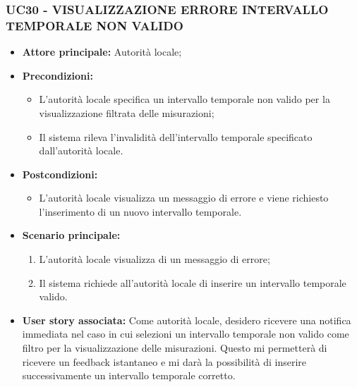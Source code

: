\subsubsection{UC30 - VISUALIZZAZIONE ERRORE INTERVALLO TEMPORALE NON VALIDO}
\begin{itemize}
      \item \textbf{Attore principale:} Autorità locale;
      \item \textbf{Precondizioni:}
            \begin{itemize} 
                  \item L'autorità locale specifica un intervallo temporale non valido per la visualizzazione filtrata delle misurazioni;
                  \item Il sistema rileva l'invalidità dell'intervallo temporale specificato dall'autorità locale.
            \end{itemize}
      \item \textbf{Postcondizioni:}
            \begin{itemize}
                  \item L'autorità locale visualizza un messaggio di errore e viene richiesto l'inserimento di un nuovo intervallo temporale.
            \end{itemize}
      \item \textbf{Scenario principale:}
                  \begin{enumerate}
                  \item L'autorità locale visualizza di un messaggio di errore;
                  \item Il sistema richiede all'autorità locale di inserire un intervallo temporale valido.
                  \end{enumerate}
      \item \textbf{User story associata:}
            Come autorità locale, desidero ricevere una notifica immediata nel caso in cui selezioni un intervallo temporale non valido come filtro per la visualizzazione delle misurazioni. Questo mi permetterà di ricevere un feedback istantaneo e mi darà la possibilità di inserire successivamente un intervallo temporale corretto.
\end{itemize}